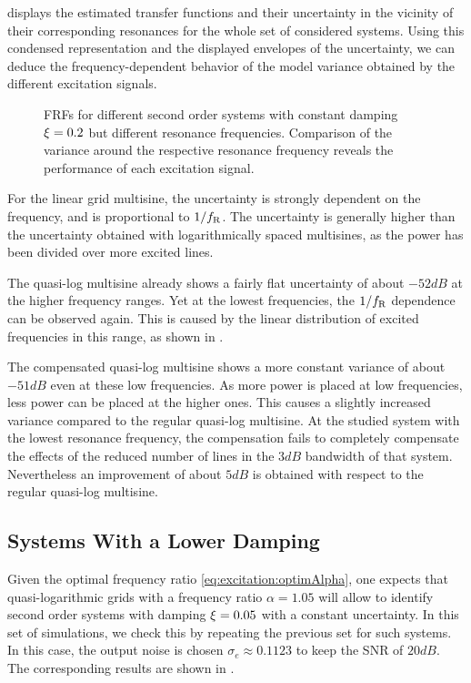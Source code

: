    displays the estimated transfer functions and their uncertainty in the vicinity of their corresponding resonances for the whole set of considered systems.
  Using this condensed representation and the displayed envelopes of the uncertainty, we can deduce the frequency-dependent behavior of the model variance obtained by the different excitation signals.

  \begin{figure}%
    \centering
      \setlength{}
      \setlength\figureheight{0.68\figurewidth}
    
    \caption[Simulated  of systems with damping $0.2$ for different excitation signals.]{%
       \Glspl{FRF} for different second order systems with constant damping $\xi_{}=0.2$ but different resonance frequencies. 
       Comparison of the variance around the respective resonance frequency reveals the performance of each excitation signal.}%
    \label{fig:excitation:damping02}
  \end{figure}

  For the linear grid multisine, the uncertainty is strongly dependent on the frequency, and is proportional to $1/f_{\mathrm{R}}$.
  The uncertainty is generally higher than the uncertainty obtained with logarithmically spaced multisines, as the power has been divided over more excited lines.

  The quasi-log multisine already shows a fairly flat uncertainty of about $-52 \unit{dB}$ at the higher frequency ranges.
  Yet at the lowest frequencies, the $1/f_{\mathrm{R}}$ dependence can be observed again.
  This is caused by the linear distribution of excited frequencies in this range, as shown in .

  The compensated quasi-log multisine shows a more constant variance of about $-51 \unit{dB}$ even at these low frequencies.
  As more power is placed at low frequencies, less power can be placed at the higher ones.
  This causes a slightly increased variance compared to the regular quasi-log multisine.
  At the studied system with the lowest resonance frequency, the compensation fails to completely compensate the effects of the reduced number of lines in the $3\unit{dB}$ bandwidth of that system.
  Nevertheless an improvement of about $5\unit{dB}$ is obtained with respect to the regular quasi-log multisine.

  \subsection{Systems With a Lower Damping}
  Given the optimal frequency ratio \eqref{eq:excitation:optimAlpha}, one expects that quasi-logarithmic grids with a frequency ratio $\alpha = 1.05$ will allow to identify second order systems with damping $\xi_{} = 0.05$ with a constant uncertainty.
  In this set of simulations, we check this by repeating the previous set for such systems.
  In this case, the output noise is chosen $\sigma_e \approx 0.1123$ to keep the \gls{SNR} of $20\unit{dB}$.
  The corresponding results are shown in .
 
